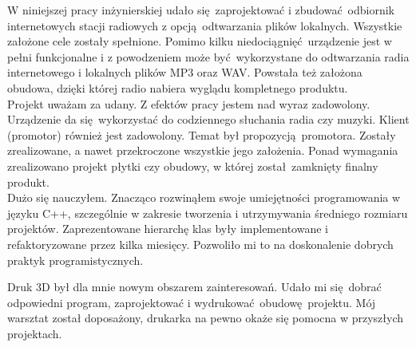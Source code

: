 \documentclass[polish]{aghengthesis}
\begin{document}
		W niniejszej pracy inżynierskiej udało się zaprojektować i zbudować odbiornik internetowych stacji radiowych z opcją odtwarzania plików lokalnych.
		Wszystkie założone cele zostały spełnione. Pomimo kilku niedociągnięć urządzenie jest w pełni funkcjonalne i z powodzeniem może być wykorzystane do odtwarzania radia internetowego i lokalnych plików MP3 oraz WAV. Powstała też założona obudowa, dzięki której radio nabiera wyglądu kompletnego produktu.
		$ $\\
		
		Projekt uważam za udany. 
		Z efektów pracy jestem nad wyraz zadowolony. Urządzenie da się wykorzystać do codziennego słuchania radia czy muzyki.
		Klient (promotor) również jest zadowolony. Temat był propozycją promotora. Zostały zrealizowane, a nawet przekroczone wszystkie jego założenia. Ponad wymagania zrealizowano projekt płytki czy obudowy, w której został zamknięty finalny produkt.
		$ $\\
		
		Dużo się nauczyłem.
		Znacząco rozwinąłem swoje umiejętności programowania w języku C++, szczególnie w zakresie tworzenia i utrzymywania średniego rozmiaru projektów. Zaprezentowane hierarchę klas były implementowane i refaktoryzowane przez kilka miesięcy. Pozwoliło mi to na doskonalenie dobrych praktyk programistycznych.
		
		$ $\\
		Druk 3D był dla mnie nowym obszarem zainteresowań. Udało mi się dobrać odpowiedni program, zaprojektować i wydrukować obudowę projektu. 
		Mój warsztat został doposażony, drukarka na pewno okaże się pomocna w przyszłych projektach.
			
		
\end{document}
